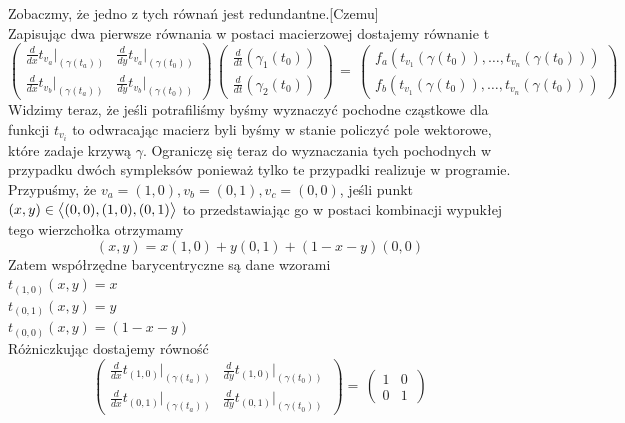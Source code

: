 \documentclass[12pt,a4paper]{article}
\begin{document}
Zobaczmy, że jedno z tych równań jest redundantne.[Czemu] 
\\Zapisując dwa pierwsze równania w postaci macierzowej dostajemy równanie
 t $$
\begin{pmatrix} 
\frac{d}{dx}{t}_{v_a}|_{(\gamma(t_a))} & \frac{d}{dy}{t}_{v_a}|_{(\gamma(t_0))} \\
\frac{d}{dx}{t}_{v_b}|_{(\gamma(t_a))} & \frac{d}{dy}{t}_{v_b}|_{(\gamma(t_0))}
\end{pmatrix}
\,
\begin{pmatrix} 
\frac{d}{dt}(\gamma_1(t_0))  \\
\frac{d}{dt}(\gamma_2(t_0))
\end{pmatrix}
\,
=
\,
\begin{pmatrix} 
f_a({t}_{v_1}(\gamma(t_0)),\ldots,{t}_{v_n}(\gamma(t_0))) \\
f_b({t}_{v_1}(\gamma(t_0)),\ldots,{t}_{v_n}(\gamma(t_0)))
\end{pmatrix}
$$
Widzimy teraz, że jeśli potrafiliśmy byśmy wyznaczyć pochodne cząstkowe dla funkcji $t_{v_i}$ to odwracając macierz byli byśmy w stanie policzyć pole wektorowe, które zadaje krzywą $\gamma$. Ograniczę się teraz do wyznaczania tych pochodnych w przypadku dwóch sympleksów ponieważ tylko te przypadki realizuje w programie.
\\Przypuśmy, że $v_a=(1,0),v_b=(0,1),v_c=(0,0)$, jeśli punkt $(x,y)\in\big{<}(0,0),(1,0),(0,1)\big{>}$ to przedstawiając go w postaci kombinacji wypukłej tego wierzchołka otrzymamy
$$
(x,y) = x(1,0)+y(0,1)+(1-x-y)(0,0)
$$
Zatem współrzędne barycentryczne są dane wzorami  
\\$t_{(1,0)}(x,y)=x$
\\$t_{(0,1)}(x,y)=y$
\\$t_{(0,0)}(x,y)=(1-x-y)$
\\
Różniczkując dostajemy równość
$$
\begin{pmatrix} 
\frac{d}{dx}{t}_{(1,0)}|_{(\gamma(t_a))} & \frac{d}{dy}{t}_{(1,0)}|_{(\gamma(t_0))} \\
\frac{d}{dx}{t}_{(0,1)}|_{(\gamma(t_a))} & \frac{d}{dy}{t}_{(0,1)}|_{(\gamma(t_0))}
\,
\end{pmatrix}
=
\,
\begin{pmatrix} 
1 & 0 \\
0 & 1
\,
\end{pmatrix}
$$
\end{document}

